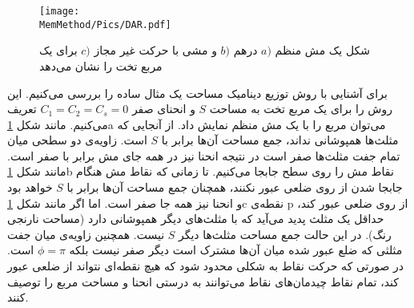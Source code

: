 \begin{figure}[h]
\begin{center}
\texttt{[image: \\MemMethod/Pics/DAR.pdf]}
\caption{
شکل یک مش منظم
$a)$
درهم
$b)$
و مشی با حرکت غیر مجاز 
$c)$
برای یک مربع تخت را نشان می‌دهد
}
\label{fig:DARs}
\end{center}
\end{figure}


برای آشنایی با روش توزیع دینامیک مساحت یک مثال ساده را بررسی می‌کنیم. این روش را برای یک مربع تخت به مساحت 
$S$
و انحنای صفر
$C_1=C_2=C_s=0$
تعریف می‌کنیم. مانند شکل
\ref{fig:DARs}a
می‌توان مربع را با یک مش منظم نمایش داد. از آنجایی که مثلث‌ها همپوشانی نداند، جمع مساحت آن‌ها برابر با 
$S$
است. زاویه‌ی دو سطحی میان تمام جفت مثلث‌ها صفر است در نتیجه انحنا نیز در همه‌ جای مش برابر با صفر است. مانند شکل
\ref{fig:DARs}b
نقاط مش را روی سطح جابجا می‌کنیم. تا زمانی که نقاط مش هنگام جابجا شدن از روی ضلعی عبور نکنند، همچنان جمع مساحت آن‌ها برابر با 
$S$
خواهد بود و انحنا  نیز همه‌ جا صفر است. اما اگر مانند شکل
\ref{fig:DARs}c
نقطه‌ی 
p
از روی ضلعی عبور کند، حداقل یک مثلث پدید می‌آید که با مثلث‌های دیگر همپوشانی دارد (مساحت نارنجی رنگ). در این حالت جمع مساحت مثلث‌ها دیگر
$S$
نیست. همچنین زاویه‌ی میان جفت مثلثی که ضلع عبور شده میان آن‌ها مشترک است دیگر صفر نیست بلکه
$\phi=\pi$
است. در صورتی که حرکت نقاط به شکلی محدود شود که هیچ نقطه‌ای نتواند از ضلعی عبور کند، تمام نقاط چیدمان‌های نقاط می‌توانند به درستی انحنا و مساحت مربع را توصیف کنند.

%
%
%




